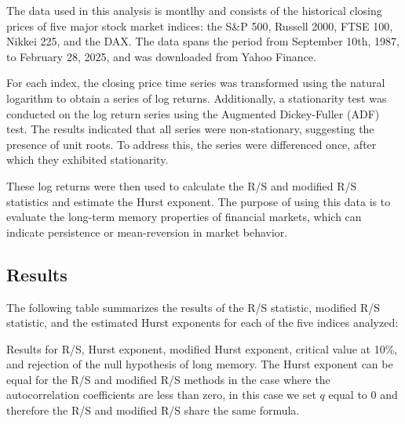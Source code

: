 \documentclass[11pt]{extarticle}
\begin{document}
The data used in this analysis is montlhy and consists of the historical closing prices of five major stock market indices: the S\&P 500,
Russell 2000, FTSE 100, Nikkei 225, and the DAX.
The data spans the period from September 10th, 1987, to February 28, 2025, and was downloaded from Yahoo Finance.

For each index, the closing price time series was transformed using the natural logarithm to obtain a series of log returns.
Additionally, a stationarity test was conducted on the log return series using the Augmented Dickey-Fuller (ADF) test.
The results indicated that all series were non-stationary, suggesting the presence of unit roots. To address this, the series were differenced once, after which they exhibited stationarity.

These log returns were then used to calculate the R/S and modified R/S statistics and estimate the Hurst exponent.
The purpose of using this data is to evaluate the long-term memory properties of financial markets, which can indicate persistence or mean-reversion in market behavior.



\subsection{Results}

The following table summarizes the results of the R/S statistic, modified R/S statistic, and the estimated Hurst exponents for each of the five indices analyzed: \\

\begin{table}[h!]
    \centering
    \caption{Results for R/S, Hurst exponent, modified Hurst exponent, critical value at 10\%, and rejection of the null
    hypothesis of long memory. The Hurst exponent can be equal for the R/S and modified R/S methods in the case where
    the autocorrelation coefficients are less than zero, in this case we set $q$ equal to 0 and therefore the R/S and modified R/S share the same formula.}
    \label{tab:Hurst_results}
\end{table}
\end{document}
